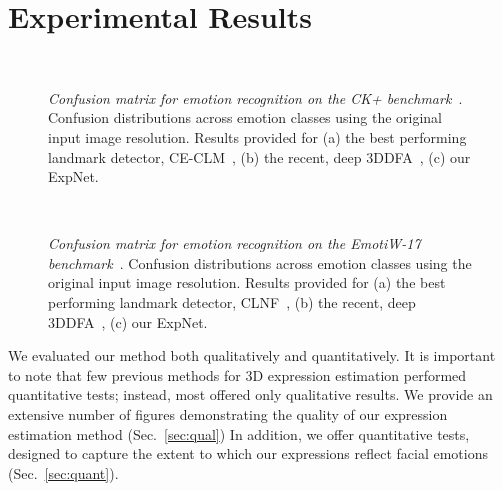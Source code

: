 \documentclass[a4paper, 10pt, conference]{ieeeconf}
\begin{document}
\section{Experimental Results}\label{sec:expt}


\begin{figure*}[tb]
\centering
{}
~
~
\caption{
{\em Confusion matrix for emotion recognition on the CK+ benchmark~\cite{lucey2010extended}}. Confusion distributions across emotion classes using the original input image resolution. Results provided for (a) the best performing landmark detector, CE-CLM~\cite{zadeh2016deep}, (b) the recent, deep 3DDFA~\cite{zhu2015}, (c) our ExpNet.
}
\label{fig:exp_conf}
\end{figure*}


\begin{figure*}[tb]
\centering
{}
~
~
\caption{
{\em Confusion matrix for emotion recognition on the EmotiW-17 benchmark~\cite{dhall2017individual}}. Confusion distributions across emotion classes using the original input image resolution. Results provided for (a) the best performing landmark detector, CLNF~\cite{baltrusaitis2013constrained}, (b) the recent, deep 3DDFA~\cite{zhu2015}, (c) our ExpNet.
}
\label{fig:exp_conf_emotiw17}
\end{figure*}


We evaluated our method both qualitatively and quantitatively. It is important to note that few previous methods for 3D expression estimation performed quantitative tests; instead, most offered only qualitative results. We provide an extensive number of figures demonstrating the quality of our expression estimation method (Sec.~\ref{sec:qual}) In addition, we offer quantitative tests, designed to capture the extent to which our expressions reflect facial emotions (Sec.~\ref{sec:quant}).  
\end{document}
